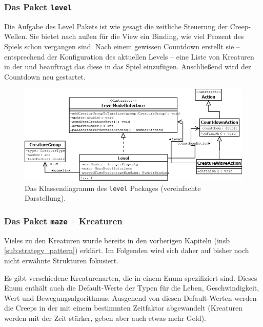 \subsubsection{Das Paket \texttt{level}} %
\label{ssub:level}

Die Aufgabe des Level Pakets ist wie gesagt die zeitliche Steuerung der Creep-Wellen. Sie bietet nach außen für die View ein Binding, wie viel Prozent des Spiels schon vergangen sind. Nach einem gewissen Countdown erstellt sie -- entsprechend der Konfiguration des aktuellen Levels -- eine Liste von Kreaturen in der  und beauftragt das  diese in das Spiel einzufügen. Anschließend wird der Countdown neu gestartet.

\begin{figure}[htb]
  \centering
  \includegraphics[width=\linewidth]{images/level-package.png}
  \caption{Das Klassendiagramm des \texttt{level} Packages (vereinfachte Darstellung).}
\end{figure}

\subsubsection{Das Paket \texttt{maze} -- Kreaturen} %
\label{ssub:maze_kreaturen}
Vieles zu den Kreaturen wurde bereits in den vorherigen Kapiteln (insb \ref{sub:strategy_pattern}) erklärt. Im Folgenden wird sich daher auf bisher noch nicht erwähnte Strukturen fokusiert.

Es gibt verschiedene Kreaturenarten, die in einem Enum  spezifiziert sind. Dieses Enum enthält auch die Default-Werte der Typen für die Leben, Geschwindigkeit, Wert und Bewegungsalgorithmus. Ausgehend von diesen Default-Werten werden die Creeps in der  mit einem bestimmten Zeitfaktor abgewandelt (Kreaturen werden mit der Zeit stärker, geben aber auch etwas mehr Geld).

